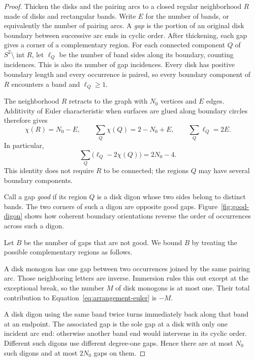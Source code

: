 \begin{proof}
Thicken the disks and the pairing arcs to a closed regular neighborhood
$R$ made of disks and rectangular bands.  Write $E$ for the number of
bands, or equivalently the number of pairing arcs.  A \emph{gap} is the
portion of an original disk boundary between successive arc ends in
cyclic order.  After thickening, each gap gives a corner of a
complementary region.  For each connected component $Q$ of
$S^2\setminus\operatorname{int}R$, let $\ell_Q$ be the number of band
sides along its boundary, counting incidences.  This is also its number
of gap incidences.  Every disk has positive boundary length and every
occurrence is paired, so every boundary component of $R$ encounters a
band and $\ell_Q\ge1$.

The neighborhood $R$ retracts to the graph with $N_0$ vertices and $E$
edges.  Additivity of Euler characteristic when surfaces are glued
along boundary circles therefore gives
\[
 \chi(R)=N_0-E,\qquad
 \sum_Q\chi(Q)=2-N_0+E,\qquad
 \sum_Q\ell_Q=2E.
\]
In particular,
\begin{equation}
 \sum_Q\bigl(\ell_Q-2\chi(Q)\bigr)=2N_0-4.
 \label{eq:arrangement-euler}
\end{equation}
This identity does not require $R$ to be connected; the regions $Q$
may have several boundary components.

Call a gap \emph{good} if its region $Q$ is a disk digon whose two sides
belong to distinct bands.  The two corners of such a digon are opposite
good gaps.  Figure~\ref{fig:good-digon} shows how coherent boundary
orientations reverse the order of occurrences across such a digon.



Let $B$ be the number of gaps that are not good.  We bound $B$ by
treating the possible complementary regions as follows.

A disk monogon has one gap between two occurrences joined by the same
pairing arc.  Those neighboring letters are inverse.  Immersion rules
this out except at the exceptional break, so the number $M$ of disk
monogons is at most one.  Their total contribution to
Equation~\ref{eq:arrangement-euler} is $-M$.

A disk digon using the same band twice turns immediately back along
that band at an endpoint.  The associated gap is the sole gap at a
disk with only one incident arc end: otherwise another band end would
intervene in its cyclic order.  Different such digons use different
degree-one gaps.  Hence there are at most $N_0$ such digons and at
most $2N_0$ gaps on them.


\end{proof}
